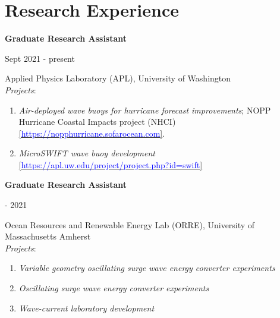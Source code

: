 \documentclass[letterpaper,11pt]{article}
\begin{document}
\section{Research Experience}
\vspace{-1pt}
%
\begin{minipage}[t]{.75\textwidth}
    \flushleft
    \textbf{Graduate Research Assistant}\\
    \end{minipage}
    \hfill
    \begin{minipage}[t]{.20\textwidth}
    \flushright
    Sept 2021 - present\\
\end{minipage}
Applied Physics Laboratory (APL), University of Washington %
\\
\textit{Projects}:
\vspace{-7pt}
\begin{enumerate}
    \item \textit{Air-deployed wave buoys for hurricane forecast improvements}; NOPP Hurricane Coastal Impacts project (NHCI) \href{https://nopphurricane.sofarocean.com/}{[\textcolor{blue}{https://nopphurricane.sofarocean.com}]}.
    \vspace{-7pt}
    \item \textit{MicroSWIFT wave buoy development} \href{https://apl.uw.edu/project/project.php?id=swift}{[\textcolor{blue}{https://apl.uw.edu/project/project.php?id=swift}]}
    \vspace{-7pt}
\end{enumerate}
%
\vspace{7pt}
%
\begin{minipage}[t]{.75\textwidth}
    \flushleft
    \textbf{Graduate Research Assistant}\\
    \end{minipage}
    \hfill
    \begin{minipage}[t]{.20\textwidth}
     - 2021\\
\end{minipage}
Ocean Resources and Renewable Energy Lab (ORRE), University of Massachusetts Amherst\\
\textit{Projects}:
\vspace{-7pt}
\begin{enumerate}
    \item \textit{Variable geometry oscillating surge wave energy converter experiments}
    \vspace{-7pt}
    \item \textit{Oscillating surge wave energy converter experiments}
    \vspace{-7pt}
    \item \textit{Wave-current laboratory development}
\end{enumerate}
\end{document}
